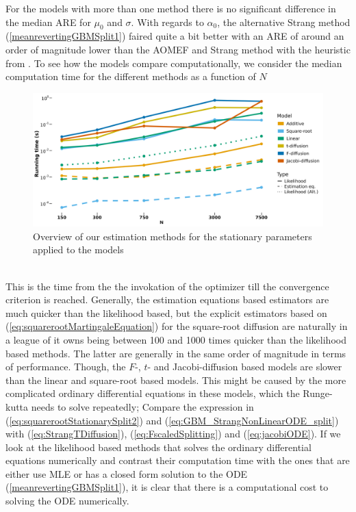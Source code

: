 For the models with more than one method there is no significant difference in the median ARE for $\mu_0$ and $\sigma$. With regards to $\alpha_0$, the alternative Strang method (\ref{meanrevertingGBMSplit1}) faired quite a bit better with an ARE of around an order of magnitude lower than the AOMEF and Strang method with the heuristic from \cite{SplittingSchemes}. To see how the models compare computationally, we consider the median computation time for the different methods as a function of $N$
\begin{figure}[h]
    \begin{center}
    \includegraphics[scale = .075]{figures/estimation_duration_stationary.jpeg}
    \caption{Overview of our estimation methods for the stationary parameters applied to the models}
    \label{figure:overviewOfDurationStationary}
    \end{center}
\end{figure}\\
This is the time from the the invokation of the optimizer till the convergence criterion is reached. Generally, the estimation equations based estimators are much quicker than the likelihood based, but the explicit estimators based on (\ref{eq:squarerootMartingaleEquation}) for the square-root diffusion are naturally in a league of it owns being between 100 and 1000 times quicker than the likelihood based methods. The latter are generally in the same order of magnitude in terms of performance. Though, the $F$-, $t$- and Jacobi-diffusion based models are slower than the linear and square-root based models. This might be caused by the more complicated ordinary differential equations in these models, which the Runge-kutta needs to solve repeatedly; Compare the expression in (\ref{eq:squarerootStationarySplit2}) and (\ref{eq:GBM_StrangNonLinearODE_split}) with (\ref{eq:StrangTDiffusion}), (\ref{eq:FscaledSplitting}) and (\ref{eq:jacobiODE}). If we look at the likelihood based methods that solves the ordinary differential equations numerically and contrast their computation time with the ones that are either use MLE or has a closed form solution to the ODE (\ref{meanrevertingGBMSplit1}), it is clear that there is a computational cost to solving the ODE numerically.


